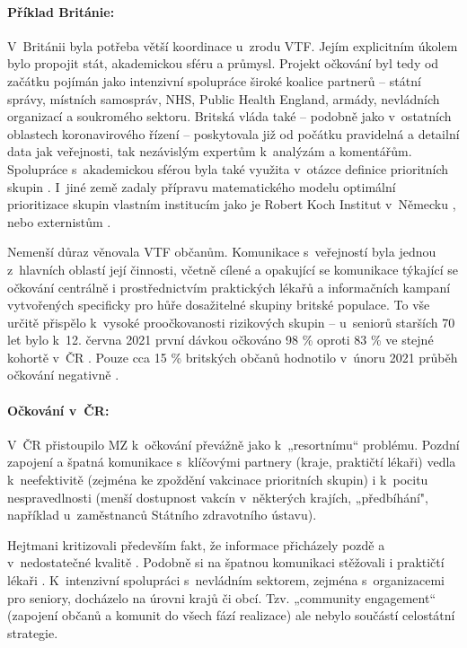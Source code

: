 \paragraph{Příklad Británie:} V~Británii byla potřeba větší koordinace u~zrodu VTF. Jejím explicitním úkolem bylo propojit stát, akademickou sféru a průmysl. Projekt očkování byl tedy od začátku pojímán jako intenzivní spolupráce široké koalice partnerů -- státní správy, místních samospráv, NHS, Public Health England, armády, nevládních organizací a soukromého sektoru. Britská vláda také – podobně jako v~ostatních oblastech koronavirového řízení – poskytovala již od počátku pravidelná a detailní data jak veřejnosti, tak nezávislým expertům k~analýzám a komentářům. Spolupráce s~akademickou sférou byla také využita v~otázce definice prioritních skupin \cite{department_of_health_and_social_care_joint_2020}. I~jiné země zadaly přípravu matematického modelu optimální prioritizace skupin vlastním institucím jako je Robert Koch Institut v~Německu \cite{rki_rki_2021}, nebo externistům \cite{dooling_phased_2020}.

Nemenší důraz věnovala VTF občanům. Komunikace s~veřejností byla jednou z~hlavních oblastí její činnosti, včetně cílené a opakující se komunikace týkající se očkování centrálně i prostřednictvím praktických lékařů a informačních kampaní vytvořených specificky pro hůře dosažitelné skupiny britské populace. To vše určitě přispělo k~vysoké proočkovanosti rizikových skupin -- u~seniorů starších 70 let bylo k~12. června 2021 první dávkou očkováno 98 \%  \cite{nhs_statistics_2021} oproti 83 \% ve stejné kohortě v~ČR \cite{noauthor_microsoft_2021}. Pouze cca 15 \% britských občanů hodnotilo v~únoru 2021 průběh očkování negativně \cite{skinner_strong_2021}.

\paragraph{Očkování v~ČR:} V~ČR přistoupilo MZ k~očkování převážně jako k~„resortnímu“ problému. Pozdní zapojení a špatná komunikace s~klíčovými partnery (kraje, praktičtí lékaři) vedla k~neefektivitě (zejména ke zpoždění vakcinace prioritních skupin) i k~pocitu nespravedlnosti (menší dostupnost vakcín v~některých krajích, „předbíhání", například u~zaměstnanců Státního zdravotního ústavu).

Hejtmani kritizovali především fakt, že informace přicházely pozdě a v~nedostatečné kvalitě \cite{dragoun_hejtmani_2021}. Podobně si na špatnou komunikaci stěžovali i praktičtí lékaři \cite{televize_nevime_2021, prima_delate_2021}. K~intenzivní spolupráci s~nevládním sektorem, zejména s~organizacemi pro seniory, docházelo na úrovni krajů či obcí. Tzv. „community engagement“ (zapojení občanů a komunit do všech fází realizace) ale nebylo součástí celostátní strategie.

